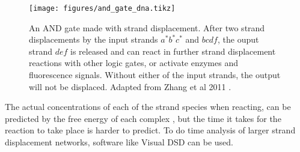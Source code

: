 \begin{figure}[H]
\centering
\texttt{[image: figures/and\_gate\_dna.tikz]}
\caption{An AND gate made with strand displacement. After two strand displacements by the input strands $a^*b^*c^*$ and $bcdf$, the ouput strand $def$ is released and can react in further strand displacement reactions with other logic gates, or activate enzymes and fluorescence signals. Without either of the input strands, the output will not be displaced. Adapted from Zhang et al 2011 \cite{Zhang2011}.}
\label{strand_displacement_and}
\end{figure}

The actual concentrations of each of the strand species when reacting, can be predicted by the free energy of each complex \cite{Zhang}, but the time it takes for the reaction to take place is harder to predict. To do time analysis of larger strand displacement networks, software like Visual DSD \cite{Lakin2011} can be used.
